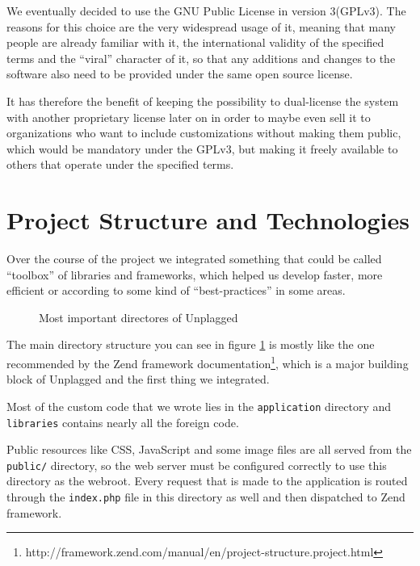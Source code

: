 We eventually decided to use the GNU Public License in version 3(GPLv3). The reasons for this choice are the very widespread usage of it, meaning that many people are already 
familiar with it, the international validity of the specified terms and the \enquote{viral}
character of it, so that any additions and changes to the software also need to be provided 
under the same open source license.

It has therefore the benefit of keeping the possibility to dual-license the system with another proprietary license later on in order to maybe even sell it to organizations who want to include
customizations without making them public, which would be mandatory under the GPLv3, but making it freely available to others that operate under the specified terms.

\section{Project Structure and Technologies}

Over the course of the project we integrated something that could be called \enquote{toolbox} of libraries and frameworks, which 
helped us develop faster, more efficient or according to some kind of \enquote{best-practices}
in some areas.

\begin{figure}[!h]
\caption{Most important directores of Unplagged}
  \label{fig:directoryStructure}
\end{figure}

The main directory structure you can see in figure \ref{fig:directoryStructure} is mostly like the one recommended by the Zend framework documentation\footnote{http://framework.zend.com/manual/en/project-structure.project.html}, which is a major building block of 
Unplagged and the first thing we integrated.

Most of the custom code that we wrote lies in the \texttt{application} directory and \texttt{libraries} contains nearly all the foreign code.

Public resources like CSS, JavaScript and some image files are all served from the \texttt{public/} directory, so the web server must be configured correctly to use this directory as the webroot. Every request that is made to the application is routed through the \texttt{index.php} file in this directory as well and then dispatched to Zend framework.


